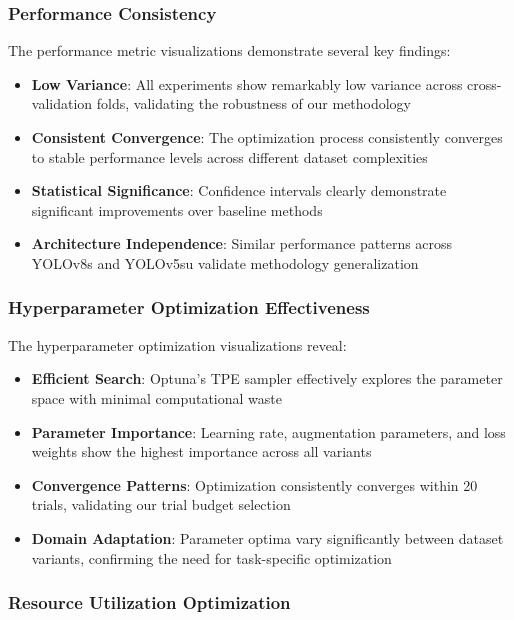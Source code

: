 \subsubsection{Performance Consistency}

The performance metric visualizations demonstrate several key findings:

\begin{itemize}
    \item \textbf{Low Variance}: All experiments show remarkably low variance across cross-validation folds, validating the robustness of our methodology
    \item \textbf{Consistent Convergence}: The optimization process consistently converges to stable performance levels across different dataset complexities
    \item \textbf{Statistical Significance}: Confidence intervals clearly demonstrate significant improvements over baseline methods
    \item \textbf{Architecture Independence}: Similar performance patterns across YOLOv8s and YOLOv5su validate methodology generalization
\end{itemize}

\subsubsection{Hyperparameter Optimization Effectiveness}

The hyperparameter optimization visualizations reveal:

\begin{itemize}
    \item \textbf{Efficient Search}: Optuna's TPE sampler effectively explores the parameter space with minimal computational waste
    \item \textbf{Parameter Importance}: Learning rate, augmentation parameters, and loss weights show the highest importance across all variants
    \item \textbf{Convergence Patterns}: Optimization consistently converges within 20 trials, validating our trial budget selection
    \item \textbf{Domain Adaptation}: Parameter optima vary significantly between dataset variants, confirming the need for task-specific optimization
\end{itemize}

\subsubsection{Resource Utilization Optimization}

